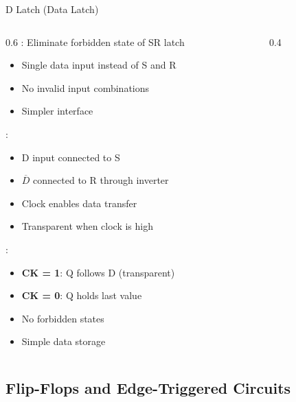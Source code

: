 \begin{frame}{D Latch (Data Latch)}
\begin{columns}
\begin{column}{0.6\textwidth}
: Eliminate forbidden state of SR latch
\begin{itemize}
\item Single data input instead of S and R
\item No invalid input combinations
\item Simpler interface
\end{itemize}
\vspace{0.3cm}
:
\begin{itemize}
\item D input connected to S
\item $\overline{D}$ connected to R through inverter
\item Clock enables data transfer
\item Transparent when clock is high
\end{itemize}
\vspace{0.3cm}
:
\begin{itemize}
\item \textbf{CK = 1}: Q follows D (transparent)
\item \textbf{CK = 0}: Q holds last value
\item No forbidden states
\item Simple data storage
\end{itemize}
\end{column}
\begin{column}{0.4\textwidth}
\begin{center}

\end{center}
\end{column}
\end{columns}
\end{frame}

\subsection{Flip-Flops and Edge-Triggered Circuits}

